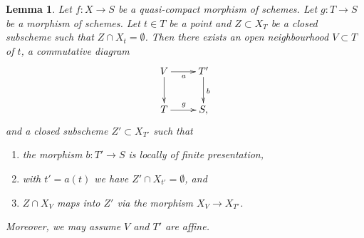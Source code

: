 \documentclass{stacks-project}
\theoremstyle{plain}
\newtheorem{lemma}[subsection]{Lemma}
\theoremstyle{definition}
\theoremstyle{remark}
\numberwithin{equation}{subsection}
\begin{document}
\begin{lemma}
\label{lemma-separate}
Let $f : X \to S$ be a quasi-compact morphism of schemes.
Let $g : T \to S$ be a morphism of schemes.
Let $t \in T$ be a point and $Z \subset X_T$ be a closed
subscheme such that $Z \cap X_t = \emptyset$.
Then there exists an open neighbourhood
$V \subset T$ of $t$, a commutative diagram
$$
\xymatrix{
V \ar[d] \ar[r]_a & T' \ar[d]^b \\
T \ar[r]^g & S,
}
$$
and a closed subscheme $Z' \subset X_{T'}$ such that
\begin{enumerate}
\item the morphism $b : T' \to S$ is locally of finite presentation,
\item with $t' = a(t)$ we have $Z' \cap X_{t'} = \emptyset$, and
\item $Z \cap X_V$ maps into $Z'$ via the morphism $X_V \to X_{T'}$.
\end{enumerate}
Moreover, we may assume $V$ and $T'$ are affine.
\end{lemma}
\end{document}
